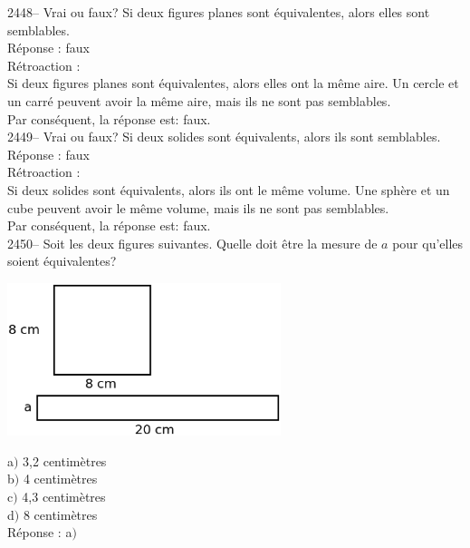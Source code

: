 \documentclass[letterpaper, 12pt]{article}
\begin{document}
2448-- Vrai ou faux? Si deux figures planes sont \'equivalentes, alors elles sont semblables.\\

R\'eponse : faux\\

R\'etroaction :\\
Si deux figures planes sont \'equivalentes, alors elles ont la m\^eme aire. Un cercle et un carr\'e peuvent avoir la m\^eme aire, mais ils ne sont pas semblables.\\
Par cons\'equent, la r\'eponse est: faux.\\

2449-- Vrai ou faux? Si deux solides sont \'equivalents, alors ils sont semblables.\\

R\'eponse : faux\\

R\'etroaction :\\
Si deux solides sont \'equivalents, alors ils ont le m\^eme volume. Une sph\`ere et un cube peuvent avoir le m\^eme volume, mais ils ne sont pas semblables.\\
Par cons\'equent, la r\'eponse est: faux.\\

2450-- Soit les deux figures suivantes. Quelle doit \^etre la mesure de $a$ pour qu'elles soient \'equivalentes?\\
\begin{center}
 \includegraphics[width=8cm,bb=0 536 571 842]{Q2450.eps}
\end{center}
a$)$ 3,2 centim\`etres\\
b$)$ 4 centim\`etres\\
c$)$ 4,3 centim\`etres\\
d$)$ 8 centim\`etres\\

R\'eponse : a$)$\\
\end{document}
